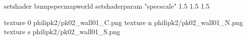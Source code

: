 setshader bumpspecmapworld
setshaderparam "specscale" 1.5 1.5 1.5

texture 0 philipk2/pk02_wall01_C.png
texture n philipk2/pk02_wall01_N.png
texture s philipk2/pk02_wall01_S.png

